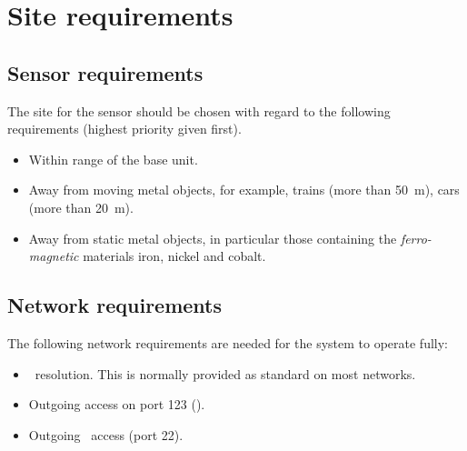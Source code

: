 \chapter{Site requirements}

\section{Sensor requirements}
The site for the sensor should be chosen with regard to the following
requirements (highest priority given first).

\begin{itemize}
\item Within range of the base unit.
\item Away from moving metal objects, for example, trains (more than
  \SI{50}{\metre}), cars (more than \SI{20}{\metre}).
\item Away from static metal objects, in particular those containing
  the \emph{ferro-magnetic} materials iron, nickel and cobalt.
\end{itemize}

\section{Network requirements}

The following network requirements are needed for the system to
operate fully:
\begin{itemize}
\item \dns\ resolution. This is normally provided
  as standard on most networks.
\item Outgoing access on port 123 (\ntp).
\item Outgoing \ssh\ access (port 22).
\end{itemize}




